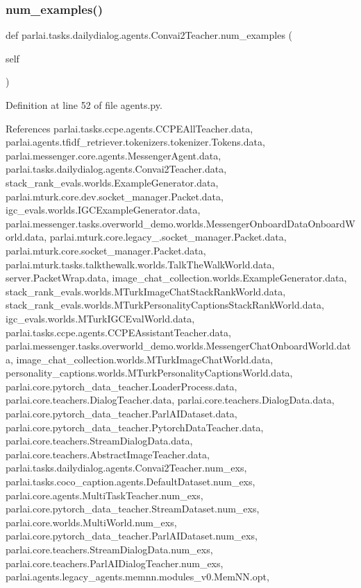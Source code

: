 \subsubsection{\texorpdfstring{num\+\_\+examples()}{num\_examples()}}
{\footnotesize\ttfamily def parlai.\+tasks.\+dailydialog.\+agents.\+Convai2\+Teacher.\+num\+\_\+examples (\begin{DoxyParamCaption}\item[{}]{self }\end{DoxyParamCaption})}



Definition at line 52 of file agents.\+py.



References parlai.\+tasks.\+ccpe.\+agents.\+C\+C\+P\+E\+All\+Teacher.\+data, parlai.\+agents.\+tfidf\+\_\+retriever.\+tokenizers.\+tokenizer.\+Tokens.\+data, parlai.\+messenger.\+core.\+agents.\+Messenger\+Agent.\+data, parlai.\+tasks.\+dailydialog.\+agents.\+Convai2\+Teacher.\+data, stack\+\_\+rank\+\_\+evals.\+worlds.\+Example\+Generator.\+data, parlai.\+mturk.\+core.\+dev.\+socket\+\_\+manager.\+Packet.\+data, igc\+\_\+evals.\+worlds.\+I\+G\+C\+Example\+Generator.\+data, parlai.\+messenger.\+tasks.\+overworld\+\_\+demo.\+worlds.\+Messenger\+Onboard\+Data\+Onboard\+World.\+data, parlai.\+mturk.\+core.\+legacy\+\_.\+socket\+\_\+manager.\+Packet.\+data, parlai.\+mturk.\+core.\+socket\+\_\+manager.\+Packet.\+data, parlai.\+mturk.\+tasks.\+talkthewalk.\+worlds.\+Talk\+The\+Walk\+World.\+data, server.\+Packet\+Wrap.\+data, image\+\_\+chat\+\_\+collection.\+worlds.\+Example\+Generator.\+data, stack\+\_\+rank\+\_\+evals.\+worlds.\+M\+Turk\+Image\+Chat\+Stack\+Rank\+World.\+data, stack\+\_\+rank\+\_\+evals.\+worlds.\+M\+Turk\+Personality\+Captions\+Stack\+Rank\+World.\+data, igc\+\_\+evals.\+worlds.\+M\+Turk\+I\+G\+C\+Eval\+World.\+data, parlai.\+tasks.\+ccpe.\+agents.\+C\+C\+P\+E\+Assistant\+Teacher.\+data, parlai.\+messenger.\+tasks.\+overworld\+\_\+demo.\+worlds.\+Messenger\+Chat\+Onboard\+World.\+data, image\+\_\+chat\+\_\+collection.\+worlds.\+M\+Turk\+Image\+Chat\+World.\+data, personality\+\_\+captions.\+worlds.\+M\+Turk\+Personality\+Captions\+World.\+data, parlai.\+core.\+pytorch\+\_\+data\+\_\+teacher.\+Loader\+Process.\+data, parlai.\+core.\+teachers.\+Dialog\+Teacher.\+data, parlai.\+core.\+teachers.\+Dialog\+Data.\+data, parlai.\+core.\+pytorch\+\_\+data\+\_\+teacher.\+Parl\+A\+I\+Dataset.\+data, parlai.\+core.\+pytorch\+\_\+data\+\_\+teacher.\+Pytorch\+Data\+Teacher.\+data, parlai.\+core.\+teachers.\+Stream\+Dialog\+Data.\+data, parlai.\+core.\+teachers.\+Abstract\+Image\+Teacher.\+data, parlai.\+tasks.\+dailydialog.\+agents.\+Convai2\+Teacher.\+num\+\_\+exs, parlai.\+tasks.\+coco\+\_\+caption.\+agents.\+Default\+Dataset.\+num\+\_\+exs, parlai.\+core.\+agents.\+Multi\+Task\+Teacher.\+num\+\_\+exs, parlai.\+core.\+pytorch\+\_\+data\+\_\+teacher.\+Stream\+Dataset.\+num\+\_\+exs, parlai.\+core.\+worlds.\+Multi\+World.\+num\+\_\+exs, parlai.\+core.\+pytorch\+\_\+data\+\_\+teacher.\+Parl\+A\+I\+Dataset.\+num\+\_\+exs, parlai.\+core.\+teachers.\+Stream\+Dialog\+Data.\+num\+\_\+exs, parlai.\+core.\+teachers.\+Parl\+A\+I\+Dialog\+Teacher.\+num\+\_\+exs, parlai.\+agents.\+legacy\+\_\+agents.\+memnn.\+modules\+\_\+v0.\+Mem\+N\+N.\+opt, 